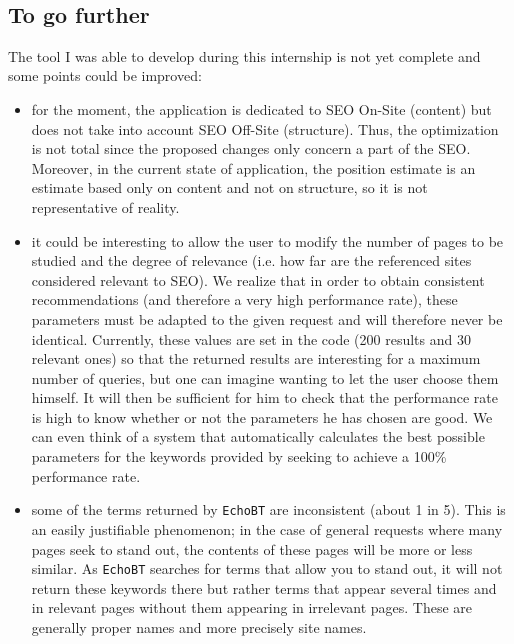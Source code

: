 \documentclass[12pt]{article}
\begin{document}
\

\subsection{To go further}

The tool I was able to develop during this internship is not yet complete and some points could be improved:
\begin{itemize}
	\item for the moment, the application is dedicated to SEO On-Site (content) but does not take into account SEO Off-Site (structure). Thus, the optimization is not total since the proposed changes only concern a part of the SEO. Moreover, in the current state of application, the position estimate is an estimate based only on content and not on structure, so it is not representative of reality.
	\item it could be interesting to allow the user to modify the number of pages to be studied and the degree of relevance (i.e. how far are the referenced sites considered relevant to SEO). We realize that in order to obtain consistent recommendations (and therefore a very high performance rate), these parameters must be adapted to the given request and will therefore never be identical. Currently, these values are set in the code (200 results and 30 relevant ones) so that the returned results are interesting for a maximum number of queries, but one can imagine wanting to let the user choose them himself. It will then be sufficient for him to check that the performance rate is high to know whether or not the parameters he has chosen are good. We can even think of a system that automatically calculates the best possible parameters for the keywords provided by seeking to achieve a 100\% performance rate.
	\item some of the terms returned by \texttt{EchoBT} are inconsistent (about 1 in 5). This is an easily justifiable phenomenon; in the case of general requests where many pages seek to stand out, the contents of these pages will be more or less similar. As \texttt{EchoBT} searches for terms that allow you to stand out, it will not return these keywords there but rather terms that appear several times and in relevant pages without them appearing in irrelevant pages. These are generally proper names and more precisely site names.
	

\end{itemize}
\end{document}
